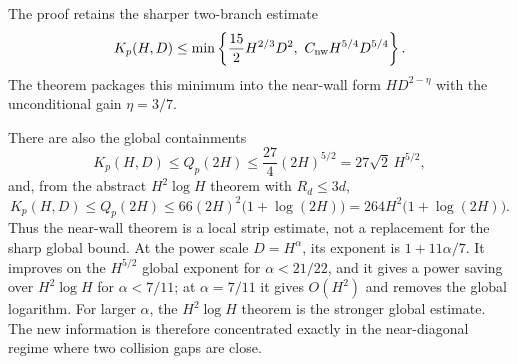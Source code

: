 \begin{remark}
\label{rem:nw-wall-map}
The proof retains the sharper two-branch estimate
\begin{equation}\label{eq:nw-sharp-min}
 K_p(H,D)
 \le\min\left\{
 \frac{15}{2}H^{2/3}D^2,
 \ C_{\rm nw}H^{5/4}D^{5/4}
 \right\}.
\end{equation}
The theorem packages this minimum into the near-wall form
$H D^{2-\eta}$ with the unconditional gain $\eta=3/7$.

There are also the global containments
\[
 K_p(H,D)\le Q_p(2H)
 \le\frac{27}{4}(2H)^{5/2}
 =27\sqrt2\,H^{5/2},
\]
and, from the abstract $H^2\log H$ theorem with $R_d\le3d$,
\[
 K_p(H,D)\le Q_p(2H)
 \le66(2H)^2\bigl(1+\log(2H)\bigr)
 =264H^2\bigl(1+\log(2H)\bigr).
\]
Thus the near-wall theorem is a local strip estimate, not a replacement
for the sharp global bound.  At the power scale $D=H^\alpha$, its exponent
is $1+11\alpha/7$.  It improves on the $H^{5/2}$ global exponent for
$\alpha<21/22$, and it gives a power saving over $H^2\log H$ for
$\alpha<7/11$; at $\alpha=7/11$ it gives $O(H^2)$ and removes the global
logarithm.  For larger $\alpha$, the $H^2\log H$ theorem is the stronger
global estimate.  The new information is therefore concentrated exactly
in the near-diagonal regime where two collision gaps are close.
\end{remark}
